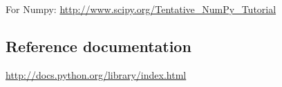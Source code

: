 \documentclass[a4paper,11pt]{article}
\begin{document}
For Numpy: \url{http://www.scipy.org/Tentative_NumPy_Tutorial}

\subsection{Reference documentation}
\url{http://docs.python.org/library/index.html}
\end{document}
